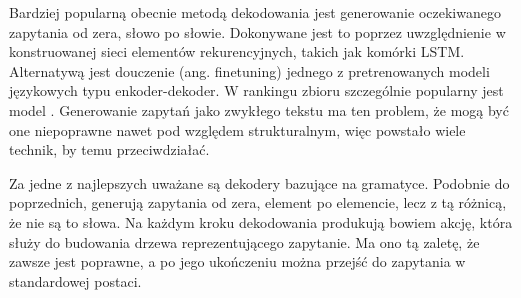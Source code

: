 Bardziej popularną obecnie metodą dekodowania jest generowanie oczekiwanego zapytania od zera, słowo po słowie. Dokonywane jest to poprzez uwzględnienie w konstruowanej sieci elementów rekurencyjnych, takich jak komórki LSTM. Alternatywą jest douczenie (ang. finetuning) jednego z pretrenowanych modeli językowych typu enkoder-dekoder. W rankingu zbioru  szczególnie popularny jest model . Generowanie zapytań jako zwykłego tekstu ma ten problem, że mogą być one niepoprawne nawet pod względem strukturalnym, więc powstało wiele technik, by temu przeciwdziałać.

Za jedne z najlepszych uważane są dekodery bazujące na gramatyce. Podobnie do poprzednich, generują zapytania od zera, element po elemencie, lecz z tą różnicą, że nie są to słowa. Na każdym kroku dekodowania produkują bowiem akcję, która służy do budowania drzewa  reprezentującego zapytanie. Ma ono tą zaletę, że zawsze jest poprawne, a po jego ukończeniu można przejść do zapytania w standardowej postaci.